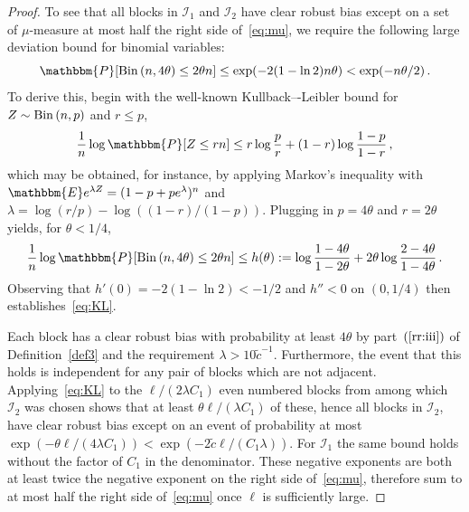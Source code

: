 \documentclass[final,12pt]{colt2018} %
\newcommand{\E}{\mathbbm{E}}
\renewcommand{\P}{\mathbbm{P}}
\newcommand{\1}{\mathbf{1}}
\def\cI{\mathcal{I}}
\newcommand{\eqb}{\begin{equation}}
\newcommand{\eqe}{\end{equation}}
\newcommand{\wt}{\widetilde}
\def\ct{{\wt c}}
\def\Bin{{\rm Bin}\,}
\begin{document}
\begin{proof}
	To see that all blocks in $\cI_1$ and $\cI_2$ have clear robust bias
	except on a set of $\mu$-measure at most half the right side of~\eqref{eq:mu},
	we require the following large deviation bound for binomial variables:
	\eqb \label{eq:KL}
	\P [\Bin (n , 4 \theta) \leq 2 \theta n]
	\leq \exp (- 2 (1 - \ln 2) n \theta) < \exp (- n \theta / 2) \, .
	\eqe
	To derive this, begin with the well-known Kullback–-Leibler bound for
	$Z \sim \Bin (n,p)$ and $r \leq p$,
	$$\frac{1}{n} \log \P [Z \leq rn] \leq r \log \frac{p}{r} + (1-r)
	\log \frac{1-p}{1-r} \, ,$$
	which may be obtained, for instance, by applying Markov's inequality
	with $\E e^{\lambda Z} = (1-p+pe^\lambda)^n$ and $\lambda = \log(r/p)
	- \log((1-r)/(1-p))$.  Plugging in $p = 4 \theta$ and $r = 2 \theta$
	yields, for $\theta < 1/4$,
	$$\frac{1}{n} \log \P [\Bin (n , 4 \theta) \leq 2 \theta n]
	\leq h(\theta) := \log \frac{1-4\theta}{1 - 2\theta}
	+ 2 \theta \log \frac{2 - 4\theta}{1 - 4\theta} \, .$$
	Observing that $h'(0) = - 2 (1 - \ln 2) < -1/2$ and $h'' < 0$ on $(0,1/4)$
	then establishes~\eqref{eq:KL}.
	
	Each block has a clear robust bias with probability at least
	$4 \theta$ by part~$(\ref{rr:iii})$ of Definition~\ref{def3}
	and the requirement $\lambda > 10\ct^{-1}$.
	Furthermore, the event that this holds
	is independent for any pair of blocks which are not adjacent.
	Applying~\eqref{eq:KL} to the $\ell / (2 \lambda C_1)$ even numbered
	blocks from among which $\cI_2$ was chosen shows that at least
	$\theta \ell / (\lambda C_1)$ of these, hence all blocks in $\cI_2$,
	have clear robust bias except on an event of probability at most
	$\exp(- \theta \ell / (4\lambda C_1)) < \exp(-2 \ct \ell / (C_1 \lambda))$.
	For $\cI_1$ the same bound holds without the factor of $C_1$ in the
	denominator.  These negative exponents are both at least twice the
	negative exponent on the right side of~\eqref{eq:mu}, therefore sum to
	at most half the right side of~\eqref{eq:mu} once $\ell$ is sufficiently large.
	

\end{proof}
\end{document}
